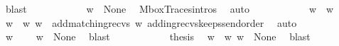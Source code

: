 \begin{isabellebody}
\ blast\isanewline
\ \ \ \ \ \ \ \ \isamarkupfalse%
\ \isamarkupfalse%
\ {\isachardoublequoteopen}w{\isacharprime}{\kern0pt}\ {\isasymin}\ {\isasymT}\isactrlbsub None\isactrlesub {\isachardoublequoteclose}\ \isamarkupfalse%
\ MboxTraces{\isachardot}{\kern0pt}intros\ \isamarkupfalse%
\ auto\isanewline
\ \ \ \ \ \ \ \ \isamarkupfalse%
\ \isamarkupfalse%
\ {\isachardoublequoteopen}w\ {\isacharequal}{\kern0pt}\ w{\isacharprime}{\kern0pt}{\isasymdown}\isactrlsub {\isacharbang}{\kern0pt}{\isachardoublequoteclose}\ \isamarkupfalse%
\ {\isacartoucheopen}w\ {\isacharequal}{\kern0pt}\ w{\isasymdown}\isactrlsub {\isacharbang}{\kern0pt}{\isacartoucheclose}\ {\isacartoucheopen}w{\isacharprime}{\kern0pt}\ {\isacharequal}{\kern0pt}\ add{\isacharunderscore}{\kern0pt}matching{\isacharunderscore}{\kern0pt}recvs\ w{\isacartoucheclose}\ adding{\isacharunderscore}{\kern0pt}recvs{\isacharunderscore}{\kern0pt}keeps{\isacharunderscore}{\kern0pt}send{\isacharunderscore}{\kern0pt}order\ \isamarkupfalse%
\ auto\isanewline
\ \ \ \ \ \ \ \ \isamarkupfalse%
\ \isamarkupfalse%
\ {\isachardoublequoteopen}{\isacharparenleft}{\kern0pt}w{\isacharprime}{\kern0pt}{\isasymdown}\isactrlsub {\isacharbang}{\kern0pt}{\isacharparenright}{\kern0pt}\ {\isasymin}\ {\isasymL}\isactrlsub {\isasyminfinity}{\isachardoublequoteclose}\ \isamarkupfalse%
\ {\isacartoucheopen}w{\isacharprime}{\kern0pt}\ {\isasymin}\ {\isasymT}\isactrlbsub None\isactrlesub {\isacartoucheclose}\ \isamarkupfalse%
\ blast\isanewline
\ \ \ \ \ \ \ \ \isamarkupfalse%
\ \isamarkupfalse%
\ {\isacharquery}{\kern0pt}thesis\ \isamarkupfalse%
\ {\isacartoucheopen}w\ {\isacharequal}{\kern0pt}\ w{\isacharprime}{\kern0pt}{\isasymdown}\isactrlsub {\isacharbang}{\kern0pt}{\isacartoucheclose}\ {\isacartoucheopen}w{\isacharprime}{\kern0pt}\ {\isasymin}\ {\isasymT}\isactrlbsub None\isactrlesub {\isacartoucheclose}\ \isamarkupfalse%
\ blast\isanewline
\ \ \ \ \ \ \isamarkupfalse%
\ \ \ \ \ \ \isanewline
\ \ \ \ \isamarkupfalse%
\isanewline
\ \ \isamarkupfalse%
\isanewline
{}\isamarkupfalse%
%
\endisatagproof
{\isafoldproof}%
%
\isadelimproof
%
\endisadelimproof
%
\isadelimdocument
%
\endisadelimdocument
%
\isatagdocument
%
\end{isabellebody}
